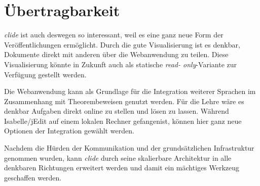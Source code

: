 \section{Übertragbarkeit}

\textit{clide} ist auch deswegen so interessant, weil es eine ganz neue Form der Veröffentlichungen
ermöglicht. Durch die gute Visualisierung ist es denkbar, Dokumente direkt mit anderen über die
Webanwendung zu teilen. Diese Visualisierung könnte in Zukunft auch als statische \textit{read-
only}-Variante zur Verfügung gestellt werden. 

Die Webanwendung kann als Grundlage für die Integration weiterer Sprachen im Zusammenhang mit
Theorembeweisen genutzt werden. Für die Lehre wäre es denkbar Aufgaben direkt online zu stellen
und lösen zu lassen. Während Isabelle/jEdit auf einem lokalen Rechner \glqq gefangen\grqq ist,
können hier ganz neue Optionen der Integration gewählt werden.

Nachdem die Hürden der Kommunikation und der grundsätzlichen Infrastruktur genommen wurden, kann
\textit{clide} durch seine skalierbare Architektur in alle denkbaren Richtungen erweitert werden und
damit ein mächtiges Werkzeug geschaffen werden.